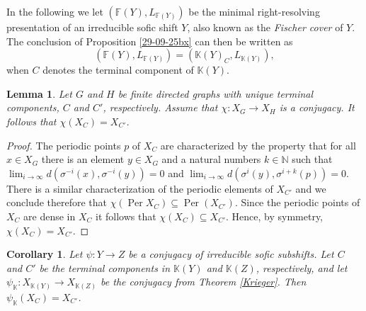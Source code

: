 \documentclass[12pt,oneside,english]{amsart}
\newcommand{\Per}{\operatorname{Per}}
\newtheorem{corollary}[thm]{Corollary}
\newtheorem{lemma}[thm]{Lemma}
\begin{document}
In the following we let $(\mathbb F(Y),L_{\mathbb F(Y)})$ be the minimal right-resolving presentation of an irreducible sofic shift $Y$, also known as the \emph{Fischer cover} of $Y$. The conclusion of Proposition \ref{29-09-25bx} can then be written as
$$
(\mathbb F(Y),L_{\mathbb F(Y)}) =  (\mathbb K(Y)_C,L_{\mathbb K(Y)}),
$$
when $C$ denotes the terminal component of $\mathbb K(Y)$.

\begin{lemma}\label{30-09-25a} Let $G$ and $H$ be finite directed graphs with unique terminal components, $C$ and $C'$, respectively. Assume that $\chi : X_G \to X_{H}$ is a conjugacy. It follows that $\chi(X_C) = X_{C'}$.
\end{lemma}
\begin{proof} The periodic points $p$ of $X_C$ are characterized by the property that for all $x \in X_G$ there is an element $y \in X_G$ and a natural numbers $k \in \mathbb N$ such that $\lim_{i \to \infty} d(\sigma^{-i}(x),\sigma^{-i}(y)) = 0$ and $\lim_{i \to \infty} d(\sigma^{i}(y),\sigma^{i+k}(p)) = 0$. There is a similar characterization of the periodic elements of $X_{C'}$ and we conclude therefore that $\chi(\Per X_C) \subseteq \Per(X_{C'})$. Since the periodic points of $X_C$ are dense in $X_C$ it follows that $\chi(X_C) \subseteq X_{C'}$. Hence, by symmetry, $\chi(X_C) = X_{C'}$.
\end{proof}

\begin{corollary}\label{30-09-25x} Let $\psi : Y \to Z$ be a conjugacy of irreducible sofic subshifts. Let $C$ and $C'$ be the terminal components in $\mathbb K(Y)$ and $\mathbb K(Z)$, respectively, and let $\psi_{\mathbb K} : X_{\mathbb K(Y)} \to X_{\mathbb K(Z)}$ be the conjugacy from Theorem \ref{Krieger}. Then $\psi_{\mathbb K}(X_C) = X_{C'}$.
\end{corollary}
\end{document}
